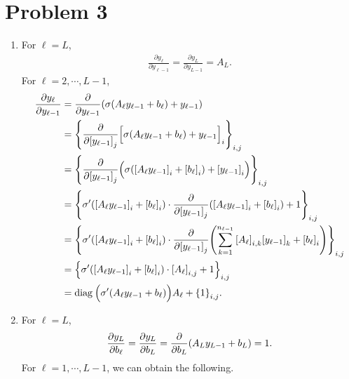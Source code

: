 \documentclass[10pt]{article}
\begin{document}
\section*{Problem 3}
\noindent{}
\begin{enumerate}[(1), leftmargin=*]
    \item For $\ell = L$, 
    \begin{align*}
        \frac{\partial y_\ell}{\partial y_{\ell-1}} = \frac{\partial y_L}{\partial y_{L-1}} = A_L.
    \end{align*}
    For $\ell = 2, \cdots, L-1$,
    \begin{align*}
        \frac{\partial y_\ell}{\partial y_{\ell-1}} &= \frac{\partial}{\partial y_{\ell-1}}\qty(\sigma\qty(A_\ell y_{\ell-1} + b_\ell) + y_{\ell-1}) \\
        &= \qty{\frac{\partial}{\partial\qty[y_{\ell-1}]_j}\Big[\sigma\qty(A_\ell y_{\ell-1} + b_\ell) + y_{\ell-1}\Big]_i}_{i, j} \\
        &= \qty{\frac{\partial}{\partial\qty[y_{\ell-1}]_j}\Big(\sigma\qty(\qty[A_\ell y_{\ell-1}]_i + \qty[b_\ell]_i) + \qty[y_{\ell-1}]_i\Big)}_{i, j} \\
        &= \qty{\sigma'\qty(\qty[A_\ell y_{\ell-1}]_i + \qty[b_\ell]_i)\cdot\frac{\partial}{\partial\qty[y_{\ell-1}]_j}\qty(\qty[A_\ell y_{\ell-1}]_i + \qty[b_\ell]_i) + 1}_{i, j} \\
        &= \qty{\sigma'\qty(\qty[A_\ell y_{\ell-1}]_i + \qty[b_\ell]_i)\cdot\frac{\partial}{\partial\qty[y_{\ell-1}]_j}\qty(\sum_{k=1}^{n_{\ell-1}}\qty[A_\ell]_{i,k}\qty[y_{\ell-1}]_k + \qty[b_\ell]_i)}_{i, j} \\
        &= \qty{\sigma'\qty(\qty[A_\ell y_{\ell-1}]_i + \qty[b_\ell]_i)\cdot\qty[A_\ell]_{i, j} + 1}_{i, j} \\
        &= \text{diag}\:\Big(\sigma'\qty(A_\ell y_{\ell-1} + b_\ell)\Big) A_\ell + \qty{1}_{i, j}.
    \end{align*}
    \item For $\ell = L$,
    \begin{align*}
        \frac{\partial y_L}{\partial b_\ell} = \frac{\partial y_L}{\partial b_L} = \frac{\partial}{\partial b_L}\qty(A_L y_{L-1} + b_L) = 1.
    \end{align*}
    For $\ell = 1, \cdots, L-1$, we can obtain the following.

\end{enumerate}
\end{document}
